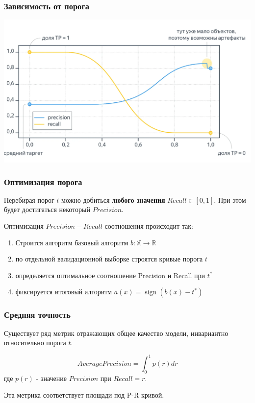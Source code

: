 \documentclass{beamer}
\DeclareMathOperator{\sign}{sign}
\begin{document}
	\begin{frame}
		\frametitle{Зависимость от порога}
		
		\includegraphics[width=1\textwidth]{img/pr_rc_th.png}
	\end{frame}
	
	\begin{frame}
		\frametitle{Оптимизация порога}
		Перебирая порог $t$ можно добиться \textbf{любого значения} $Recall \in [0, 1]$. При этом будет достигаться некоторый $Precision$. 
		
		\vspace{15pt}
		
		Оптимизация $Precision-Recall$ соотношения происходит так:
		\begin{enumerate}
			\item Строится алгоритм базовый алгоритм $b: \mathbb{X} \rightarrow \mathbb{R}$
			\item по отдельной валидационной выборке строятся кривые порога $t$
			\item определяется оптимальное соотношение Precision и Recall при $t^{*}$
			\item фиксируется итоговый алгоритм $a(x) = \sign \left( b(x) - t^{*} \right)$
		\end{enumerate} 
	\end{frame}
	
	\begin{frame}
		\frametitle{Средняя точность}
		Существует ряд метрик отражающих общее качество модели, инвариантно относительно порога $t$. 
		
		\[
		AveragePrecision = \int_{0}^{1} p(r) dr
		\]
		где $p(r)$ - значение $Precision$ при $Recall = r$.
		
		\vspace{15pt}
		
		Эта метрика соответствует площади под P-R кривой.
		
	\end{frame}
	
\end{document}
